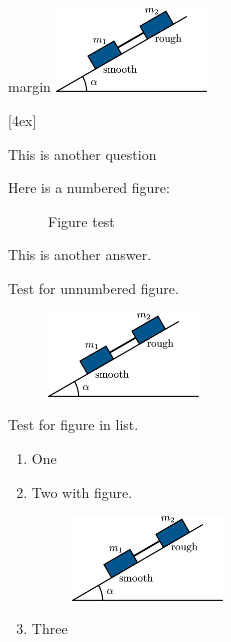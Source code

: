 \documentclass[solutionsatend]{ouunit}
\begin{document}
\lipsum[134]
\begin{marginfigure*}
\fboxsep 0pt%
\begin{outikzfig}[figurebox]{margin}
\includegraphics[width=4cm]{test}
\end{outikzfig}
\end{marginfigure*}
[4ex]

\lipsum[133]

\begin{exercise}\label{exe-fig-test}
This is another question
\begin{solution}
Here is a numbered figure:
\begin{figure}
\caption{Figure test \label{fig-placement-test}}
\end{figure}
This is another answer.
\end{solution}
\end{exercise}

Test for unnumbered figure.

\begin{figure}
\includegraphics[width=4cm]{test}
\end{figure}

Test for figure in list.
\begin{enumerate}
\item
One
\item
Two with figure.
\begin{figure}
\includegraphics[width=4cm]{test}
\end{figure}
\item
Three
\end{enumerate}
\end{document}
